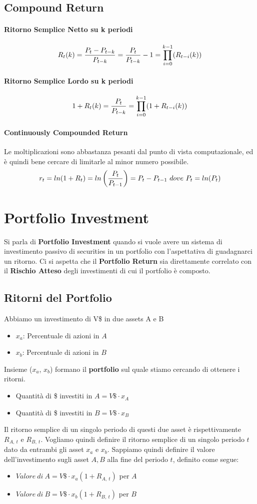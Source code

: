 \documentclass[12pt]{article}
\begin{document}
\subsection{Compound Return}
\paragraph{Ritorno Semplice Netto su k periodi}
$$R_t(k)={{P_t - P_{t-k}}\over P_{t-k}}={P_t \over P_{t-k}}-1= \prod_{i=0}^{k-1}(R_{t-i}(k))$$
\paragraph{Ritorno Semplice Lordo su k periodi}
$$1 + R_{t}(k)={P_t \over P_{t-k}}=\prod_{i=0}^{k-1}(1+ R_{t-i}(k))$$
\paragraph{Continuously Compounded Return}
Le moltiplicazioni sono abbastanza pesanti dal punto di vista computazionale, ed è quindi bene cercare di limitarle al minor numero possibile.
$$r_t=ln(1+R_t)=ln\left(P_t \over {P_{t-1}} \right)=P_t - P_{t-1} \ dove \ P_t=ln(P_t)$$
\section{Portfolio Investment}
Si parla di \textbf{Portfolio Investment} quando si vuole avere un sistema di investimento passivo di securities in un portfolio con l’aspettativa di guadagnarci un ritorno. Ci si aspetta che il \textbf{Portfolio Return} sia direttamente correlato con il \textbf{Rischio Atteso} degli investimenti di cui il portfolio è composto.
\subsection{Ritorni del Portfolio}
Abbiamo un investimento di V\$ in due assets A e B
\begin{itemize}
    \item $x_a$: Percentuale di azioni in $A$
    \item $x_b$: Percentuale di azioni in $B$
\end{itemize}
Insieme ($x_a$, $x_b$) formano il \textbf{portfolio} sul quale stiamo cercando di ottenere i ritorni.
\begin{itemize}
    \item Quantità di \$ investiti in $A=V\$ \cdot x_A$
    \item Quantità di \$ investiti in $B=V\$ \cdot x_B$
\end{itemize}
Il ritorno semplice di un singolo periodo di questi due asset è rispettivamente $R_{A,\ t}$ e $R_{B,\ t}$. Vogliamo quindi definire il ritorno semplice di un singolo periodo $t$ dato da entrambi gli asset $x_a$ e $x_b$. Sappiamo quindi definire il valore dell’investimento sugli asset $A,B$ alla fine del periodo $t$, definito come segue:
\begin{itemize}
    \item $Valore \ di \ A = V\$ \cdot x_a(1+ R_{A,\ t})$ per $A$
    \item $Valore \ di \ B = V\$ \cdot x_b(1+ R_{B,\ t})$ per $B$
\end{itemize}
\end{document}
